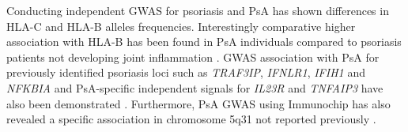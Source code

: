 Conducting independent GWAS for psoriasis and PsA has shown differences in HLA-C and HLA-B alleles frequencies. Interestingly comparative higher association with HLA-B has been found in PsA individuals compared to psoriasis patients not developing joint inflammation \parencite{Winchester2012, Okada2014}. GWAS association with PsA for previously identified psoriasis loci such as \textit{TRAF3IP}, \textit{IFNLR1}, \textit{IFIH1} and \textit{NFKBIA} and PsA-specific independent signals for \textit{IL23R} and \textit{TNFAIP3} have also been demonstrated \parencite{Ellinghaus2010, Stuart2015}.  %
Furthermore, PsA GWAS using Immunochip has also revealed a specific association in chromosome 5q31 not reported previously \parencite{Bowes2015}. 




